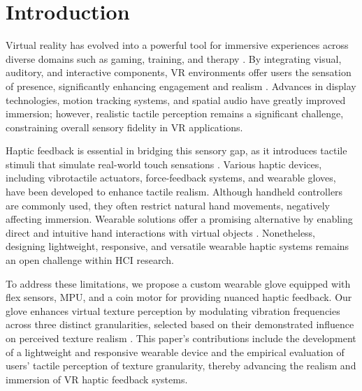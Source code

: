 \documentclass[graybox]{svmult}
\begin{document}
\section{Introduction}
Virtual reality has evolved into a powerful tool for immersive experiences across diverse domains such as gaming, training, and therapy \cite{slater2016enhancing}. By integrating visual, auditory, and interactive components, VR environments offer users the sensation of presence, significantly enhancing engagement and realism \cite{biocca2013communication}. Advances in display technologies, motion tracking systems, and spatial audio have greatly improved immersion; however, realistic tactile perception remains a significant challenge, constraining overall sensory fidelity in VR applications.

Haptic feedback is essential in bridging this sensory gap, as it introduces tactile stimuli that simulate real-world touch sensations \cite{culbertson2018haptics}. Various haptic devices, including vibrotactile actuators, force-feedback systems, and wearable gloves, have been developed to enhance tactile realism. Although handheld controllers are commonly used, they often restrict natural hand movements, negatively affecting immersion. Wearable solutions offer a promising alternative by enabling direct and intuitive hand interactions with virtual objects \cite{pacchierotti2017wearable}. Nonetheless, designing lightweight, responsive, and versatile wearable haptic systems remains an open challenge within HCI research.

To address these limitations, we propose a custom wearable glove equipped with flex sensors, MPU, and a coin motor for providing nuanced haptic feedback. Our glove enhances virtual texture perception by modulating vibration frequencies across three distinct granularities, selected based on their demonstrated influence on perceived texture realism \cite{strohmeier2017generating,bensmaia2005vibrations}. This paper's contributions include the development of a lightweight and responsive wearable device and the empirical evaluation of users' tactile perception of texture granularity, thereby advancing the realism and immersion of VR haptic feedback systems.
\end{document}
